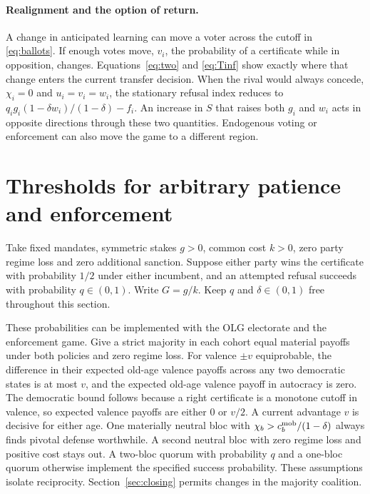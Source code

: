 \documentclass[11pt,letterpaper]{article}
\begin{document}
\paragraph{Realignment and the option of return.}
A change in anticipated learning can move a voter across the cutoff in \eqref{eq:ballots}. If enough votes move, \(v_i\), the probability of a certificate while in opposition, changes. Equations~\eqref{eq:two} and \eqref{eq:Tinf} show exactly where that change enters the current transfer decision. When the rival would always concede, \(\chi_i=0\) and \(u_i=v_i=w_i\), the stationary refusal index reduces to \(q_i g_i(1-\delta w_i)/(1-\delta)-f_i\). An increase in \(S\) that raises both \(g_i\) and \(w_i\) acts in opposite directions through these two quantities. Endogenous voting or enforcement can also move the game to a different region.

\newpage
\section{Thresholds for arbitrary patience and enforcement}\label{sec:thresholds}
Take fixed mandates, symmetric stakes \(g>0\), common cost \(k>0\), zero party regime loss and zero additional sanction. Suppose either party wins the certificate with probability \(1/2\) under either incumbent, and an attempted refusal succeeds with probability \(q\in(0,1)\). Write \(G=g/k\). Keep \(q\) and \(\delta\in(0,1)\) free throughout this section.

These probabilities can be implemented with the OLG electorate and the enforcement game. Give a strict majority in each cohort equal material payoffs under both policies and zero regime loss. For valence \(\pm v\) equiprobable, the difference in their expected old-age valence payoffs across any two democratic states is at most \(v\), and the expected old-age valence payoff in autocracy is zero. The democratic bound follows because a right certificate is a monotone cutoff in valence, so expected valence payoffs are either 0 or \(v/2\). A current advantage \(v\) is decisive for either age. One materially neutral bloc with \(\chi_b>c_b^{\rm mob}/(1-\delta)\) always finds pivotal defense worthwhile. A second neutral bloc with zero regime loss and positive cost stays out. A two-bloc quorum with probability \(q\) and a one-bloc quorum otherwise implement the specified success probability. These assumptions isolate reciprocity. Section~\ref{sec:closing} permits changes in the majority coalition.
\end{document}

